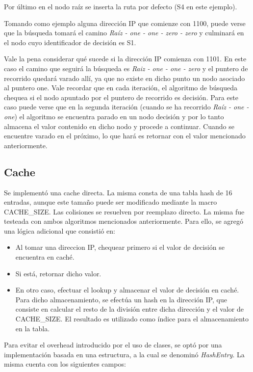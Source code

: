 Por último en el nodo raíz se inserta la ruta por defecto (S4 en este ejemplo).

Tomando como ejemplo alguna dirección IP que comienze con 1100, puede verse que la búsqueda tomará el camino \textit{Raíz - one - one - zero - zero} y culminará en el nodo cuyo identificador de decisión es S1. 

Vale la pena considerar qué sucede si la dirección IP comienza con 1101. En este caso el camino que seguirá la búsqueda es \textit{Raiz - one - one - zero} y el puntero de recorrido quedará varado allí, ya que no existe en dicho punto un nodo asociado al puntero one. Vale recordar que en cada iteración, el algoritmo de búsqueda chequea si el nodo apuntado por el puntero de recorrido es decisión. Para este caso puede verse que en la segunda iteración (cuando se ha recorrido \textit{Raíz - one - one}) el algoritmo se encuentra parado en un nodo decisión y por lo tanto almacena el valor contenido en dicho nodo y procede a continuar. Cuando se encuentre varado en el próximo, lo que hará es retornar con el valor mencionado anteriormente. 

\subsection {Cache}

Se implementó una cache directa. La misma consta de una tabla hash de 16 entradas, aunque este tamaño puede ser modificado mediante la macro CACHE\_SIZE. Las colisiones se resuelven por reemplazo directo. La misma fue testeada con ambos algoritmos mencionados anteriormente. Para ello, se agregó una lógica adicional que consistió en:

\begin{itemize}
	\item Al tomar una direccion IP, chequear primero si el valor de decisión se encuentra en caché.
	\item Si está, retornar dicho valor.
	\item En otro caso, efectuar el lookup y almacenar el valor de decisión en caché. Para dicho almacenamiento, se efectúa un hash en la dirección IP, que consiste en calcular el resto de la división entre dicha dirección y el valor de CACHE\_SIZE. El resultado es utilizado como índice para el almacenamiento en la tabla.
\end{itemize}

Para evitar el overhead introducido por el uso de clases, se optó por una implementación basada en una estructura, a la cual se denominó \textit{HashEntry}. La misma cuenta con los siguientes campos:

